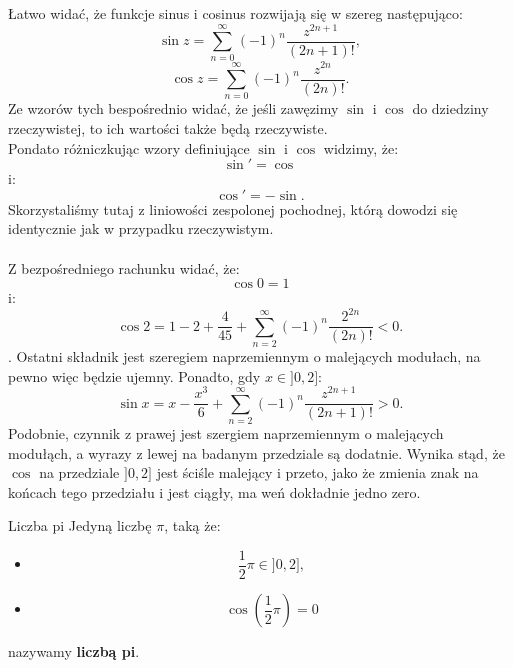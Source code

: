 \documentclass{article}
\newcounter{defi}
\numberwithin{defi}{section}
\numberwithin{defi}{section}
\newcommand{\oo}{\infty}
\providecommand{\half}{\frac{1}{2}}
\newcommand{\tb}[1]{\textbf{#1}}
\begin{document}
\begin{obs}{}
    Łatwo widać, że funkcje sinus i cosinus rozwijają się w szereg następująco: \begin{equation}
        \sin z = \sum_{n = 0}^{\oo} (-1)^n \frac{z ^ {2n + 1}}{(2n+1)!},
    \end{equation} \begin{equation}
        \cos z = \sum_{n = 0}^{\oo} (-1)^n \frac{z ^ {2n}}{(2n)!}.
    \end{equation} Ze wzorów tych bespośrednio widać, że jeśli zawęzimy $\sin$ i $\cos$ do dziedziny rzeczywistej, to ich wartości także będą rzeczywiste. \\
    Pondato różniczkując wzory definiujące $\sin$ i $\cos$ widzimy, że: \begin{equation}
        \sin ' = \cos
    \end{equation} i: \begin{equation}
        \cos' = -\sin.
    \end{equation} Skorzystaliśmy tutaj z liniowości zespolonej pochodnej, którą dowodzi się identycznie jak w przypadku rzeczywistym.
\end{obs}
\paragraph{} 
Z bezpośredniego rachunku widać, że: \begin{equation}
    \cos 0 = 1
\end{equation} i: \begin{equation}
    \cos 2 = 1 - 2 +  \frac{4}{45} + \sum_{n = 2}^{\oo} (-1)^n \frac{2^{2n}}{(2n)!} < 0.
\end{equation}. Ostatni składnik jest szeregiem naprzemiennym o malejących modułach, na pewno więc będzie ujemny.
Ponadto, gdy $x \in ]0, 2]$: \begin{equation}
    \sin x =  x - \frac{x^3}{6}+ \sum_{n = 2}^{\oo} (-1)^n \frac{z ^ {2n + 1}}{(2n+1)!} > 0.
\end{equation} Podobnie, czynnik z prawej jest szergiem naprzemiennym o malejących modułąch, a wyrazy z lewej na badanym przedziale są dodatnie. Wynika stąd, że $\cos$ na przedziale $]0, 2]$ jest ściśle malejący i przeto, jako że zmienia znak na końcach tego przedziału i jest ciągły, ma weń dokładnie jedno zero.

\begin{defr}{Liczba pi}
    Jedyną liczbę $\pi$, taką że: \begin{itemize}
        \item \begin{equation}
            \half \pi \in ]0, 2],
        \end{equation}
        \item \begin{equation}
            \cos (\half \pi) = 0
        \end{equation}
    \end{itemize}
    nazywamy \tb{liczbą pi}.
\end{defr}
\end{document}
